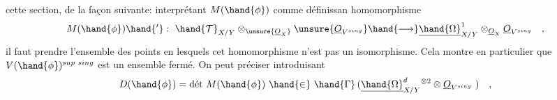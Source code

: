 cette section, de la façon suivante: interprétant $M(\hand{\phi})$ comme définissan
homomorphisme
\[
M(\hand{\phi})\hand{'} : \ \hand{\mathcal{T}}_{X/Y} \otimes_{\unsure{\underline{O}_X}} \unsure{\underline{O}_{V^{sing}}} \hand{\longrightarrow} \underline{\hand{\Omega}}^1_{X/Y} \otimes_{\underline{O}_X} \underline{O}_{V^{sing}} \quad ,
\]
il faut prendre l'ensemble des points en lesquels cet homomorphisme
n'est pas un isomorphisme. Cela montre en particulier que $V(\hand{\phi})^{sup\ sing}$
est un ensemble fermé. On peut  préciser  introduisant
\[
D(\hand{\phi}) = \text{dét}\ M(\hand{\phi}) \ \hand{\in} \ \hand{\Gamma}\,(\underline{\hand{\Omega}}^d_{X/Y}{}^{\otimes 2} \otimes \underline{O}_{V^{sing}}\ ) \quad ,
\]

